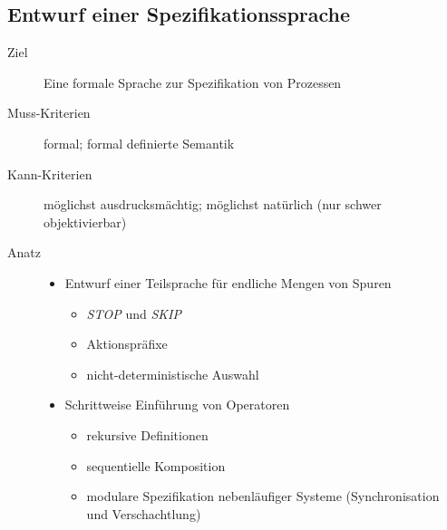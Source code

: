 
													\subsection{Entwurf einer Spezifikationssprache}
														\begin{description}
															\item[Ziel] Eine formale Sprache zur Spezifikation von Prozessen
															\item[Muss-Kriterien] formal; formal definierte Semantik
															\item[Kann-Kriterien] möglichst ausdrucksmächtig; möglichst natürlich (nur schwer objektivierbar)
															\item[Anatz] \begin{itemize}
																	\item Entwurf einer Teilsprache für endliche Mengen von Spuren
																		\begin{itemize}
																			\item \textit{STOP} und \textit{SKIP}
																			\item Aktionspräfixe
																			\item nicht-deterministische Auswahl
																		\end{itemize}
																	\item Schrittweise Einführung von Operatoren
																		\begin{itemize}
																			\item rekursive Definitionen
																			\item sequentielle Komposition
																			\item modulare Spezifikation nebenläufiger Systeme (Synchronisation und Verschachtlung)
																		\end{itemize}
																\end{itemize}
														\end{description}

